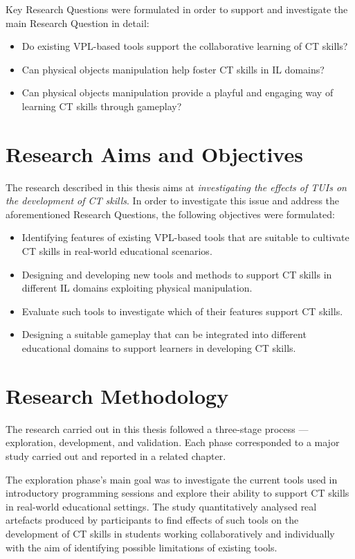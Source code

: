 Key Research Questions were formulated in order to support and investigate the main Research Question in detail:
\begin{itemize}
    \item Do existing \ac{VPL}-based tools support the collaborative learning of \ac{CT} skills?
    \item Can physical objects manipulation help foster \acl{CT} skills in \acl{IL} domains?
    \item Can physical objects manipulation provide a playful and engaging way of learning \ac{CT} skills through gameplay?
\end{itemize}

\section{Research Aims and Objectives}
The research described in this thesis aims at \textit{investigating the effects of \acp{TUI} on the development of \ac{CT} skills}. In order to investigate this issue and address the aforementioned Research Questions, the following objectives were formulated:
\begin{itemize}
    \item Identifying features of existing \ac{VPL}-based tools that are suitable to cultivate \ac{CT} skills in real-world educational scenarios.
    \item Designing and developing new tools and methods to support \ac{CT} skills in different \ac{IL} domains exploiting physical manipulation.
    \item Evaluate such tools to investigate which of their features support \ac{CT} skills.
    \item Designing a suitable gameplay that can be integrated into different educational domains to support learners in developing \ac{CT} skills.
\end{itemize}

\section{Research Methodology}
The research carried out in this thesis followed a three-stage process --- exploration, development, and validation. Each phase corresponded to a major study carried out and reported in a related chapter.

The exploration phase's main goal was to investigate the current tools used in introductory programming sessions and explore their ability to support \ac{CT} skills in real-world educational settings. The study quantitatively analysed real artefacts produced by participants to find effects of such tools on the development of \ac{CT} skills in students working collaboratively and individually with the aim of identifying possible limitations of existing tools.

